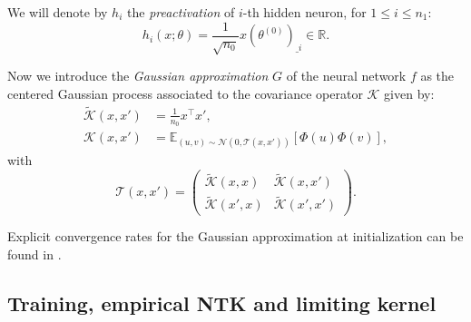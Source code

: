 \documentclass{article}
\theoremstyle{definition}
\theoremstyle{remark}
\numberwithin{equation}{section}
\newcommand{\R}{\mathbb{R}}
\newcommand{\E}{\mathbb{E}}
\begin{document}
We will denote by $h_i$ the \emph{preactivation} of $i$-th hidden neuron, for $1\le i\le n_1$:
\[
    h_i(x;\theta) = \frac{1}{\sqrt{n_0}}x (\theta^{(0)})_{\_ i} \in \R.
\]



Now we introduce the \emph{Gaussian approximation} $G$ of the neural network $f$ as the centered Gaussian process associated to the covariance operator $\mathcal K$ given by:
\begin{align*}
    \tilde {\mathcal K}(x,x') &= \frac{1}{n_0}x^\top x', \\
    \mathcal K(x,x') &= \E_{(u,v) \sim \mathcal N(0,\mathcal T(x,x'))}[\Phi(u)\Phi(v)],
\end{align*}
with \[
\mathcal T(x,x') = \begin{pmatrix}
    \tilde {\mathcal K}(x,x) & \tilde {\mathcal K}(x,x') \\
    \tilde {\mathcal K}(x',x) & \tilde {\mathcal K}(x',x')
\end{pmatrix}.\]

Explicit convergence rates for the Gaussian approximation at initialization can be found in \cite{BasteriTrevisan2023,Favaro2025}.

\subsection{Training, empirical NTK and limiting kernel}
\end{document}

